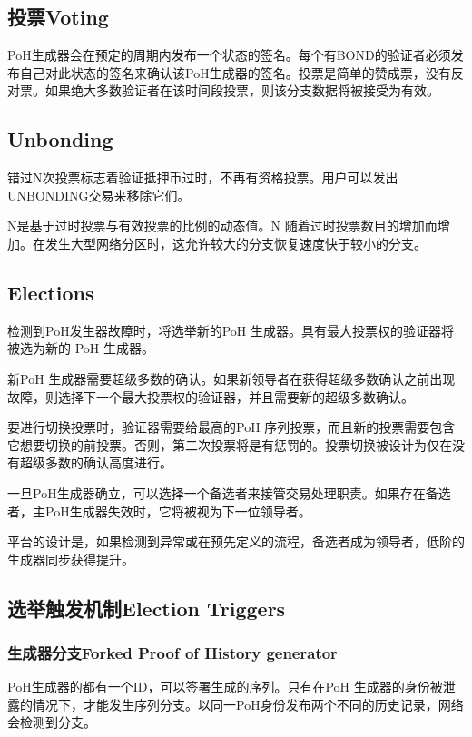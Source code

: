 \documentclass[12pt, uft8]{ctexart}
\begin{document}
\subsection{投票Voting}
PoH生成器会在预定的周期内发布一个状态的签名。每个有BOND的验证者必须发布自己对此状态的签名来确认该PoH生成器的签名。投票是简单的赞成票，没有反对票。如果绝大多数验证者在该时间段投票，则该分支数据将被接受为有效。

\subsection{Unbonding}

错过N次投票标志着验证抵押币过时，不再有资格投票。用户可以发出UNBONDING交易来移除它们。

N是基于过时投票与有效投票的比例的动态值。N 随着过时投票数目的增加而增加。在发生大型网络分区时，这允许较大的分支恢复速度快于较小的分支。

\subsection{Elections}\label{subsec:elections}
检测到PoH发生器故障时，将选举新的PoH 生成器。具有最大投票权的验证器将被选为新的 PoH 生成器。

新PoH 生成器需要超级多数的确认。如果新领导者在获得超级多数确认之前出现故障，则选择下一个最大投票权的验证器，并且需要新的超级多数确认。

要进行切换投票时，验证器需要给最高的PoH 序列投票，而且新的投票需要包含它想要切换的前投票。否则，第二次投票将是有惩罚的。投票切换被设计为仅在没有超级多数的确认高度进行。

一旦PoH生成器确立，可以选择一个备选者来接管交易处理职责。如果存在备选者，主PoH生成器失效时，它将被视为下一位领导者。

平台的设计是，如果检测到异常或在预先定义的流程，备选者成为领导者，低阶的生成器同步获得提升。

\subsection{选举触发机制Election Triggers}
\subsubsection{生成器分支Forked Proof of History generator}

PoH生成器的都有一个ID，可以签署生成的序列。只有在PoH 生成器的身份被泄露的情况下，才能发生序列分支。以同一PoH身份发布两个不同的历史记录，网络会检测到分支。
\end{document}
